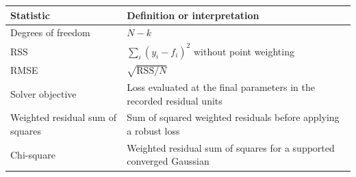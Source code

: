 \documentclass[
  10pt,
  a4paper,
  oneside]{scrreprt}
\begin{document}
\begin{longtable}[]{@{}ll@{}}
\toprule
\begin{minipage}[b]{0.47\columnwidth}\raggedright
Statistic\strut
\end{minipage} & \begin{minipage}[b]{0.47\columnwidth}\raggedright
Definition or interpretation\strut
\end{minipage}\tabularnewline
\midrule
\endhead
\begin{minipage}[t]{0.47\columnwidth}\raggedright
Degrees of freedom\strut
\end{minipage} & \begin{minipage}[t]{0.47\columnwidth}\raggedright
\(N-k\)\strut
\end{minipage}\tabularnewline
\begin{minipage}[t]{0.47\columnwidth}\raggedright
RSS\strut
\end{minipage} & \begin{minipage}[t]{0.47\columnwidth}\raggedright
\(\sum_i(y_i-f_i)^2\) without point weighting\strut
\end{minipage}\tabularnewline
\begin{minipage}[t]{0.47\columnwidth}\raggedright
RMSE\strut
\end{minipage} & \begin{minipage}[t]{0.47\columnwidth}\raggedright
\(\sqrt{\mathrm{RSS}/N}\)\strut
\end{minipage}\tabularnewline
\begin{minipage}[t]{0.47\columnwidth}\raggedright
Solver objective\strut
\end{minipage} & \begin{minipage}[t]{0.47\columnwidth}\raggedright
Loss evaluated at the final parameters in the recorded residual
units\strut
\end{minipage}\tabularnewline
\begin{minipage}[t]{0.47\columnwidth}\raggedright
Weighted residual sum of squares\strut
\end{minipage} & \begin{minipage}[t]{0.47\columnwidth}\raggedright
Sum of squared weighted residuals before applying a robust loss\strut
\end{minipage}\tabularnewline
\begin{minipage}[t]{0.47\columnwidth}\raggedright
Chi-square\strut
\end{minipage} & \begin{minipage}[t]{0.47\columnwidth}\raggedright
Weighted residual sum of squares for a supported converged Gaussian

\end{minipage}
\end{longtable}
\end{document}
